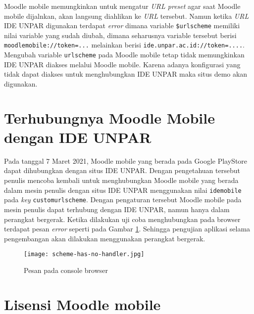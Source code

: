 Moodle mobile memungkinkan untuk mengatur \textit{URL preset} agar saat Moodle mobile dijalnkan, akan langsung diahlikan ke \textit{URL} tersebut. Namun ketika \textit{URL} IDE UNPAR digunakan terdapat \textit{error} dimana variable \texttt{\$urlscheme} memiliki nilai variable yang sudah diubah, dimana seharusnya variable tersebut berisi \texttt{moodlemobile://token=...} melainkan berisi \texttt{ide.unpar.ac.id://token=....}. Mengubah variable \texttt{urlscheme} pada Moodle mobile tetap tidak memungkinkan  IDE UNPAR diakses melalui Moodle mobile. Karena  adanya konfigurasi yang tidak dapat diakses untuk menghubungkan IDE UNPAR maka situs demo akan digunakan.

\section{Terhubungnya Moodle Mobile dengan IDE UNPAR}

Pada tanggal 7 Maret 2021, Moodle mobile yang berada pada Google PlayStore dapat dihubungkan dengan situs IDE UNPAR. Dengan pengetahuan tersebut penulis mencoba kembali untuk menghubungkan Moodle mobile yang berada dalam mesin penulis dengan situs IDE UNPAR menggunakan nilai \texttt{idemobile} pada \textit{key} \texttt{customurlscheme}. Dengan pengaturan tersebut Moodle mobile pada mesin penulis dapat terhubung dengan IDE UNPAR, namun hanya dalam perangkat bergerak. Ketika dilakukan uji coba menghubungkan pada browser terdapat pesan \textit{error} seperti pada Gambar \ref{fig:protocolerror}. Sehingga pengujian aplikasi selama pengembangan akan dilakukan menggunakan perangkat bergerak.

\begin{figure}[H] 
	\centering  
	\texttt{[image: scheme-has-no-handler.jpg]}  
	\caption[Pesan pada Console browser] {Pesan pada console browser} 
	\label{fig:protocolerror} 
\end{figure} 

\section{Lisensi Moodle mobile}

